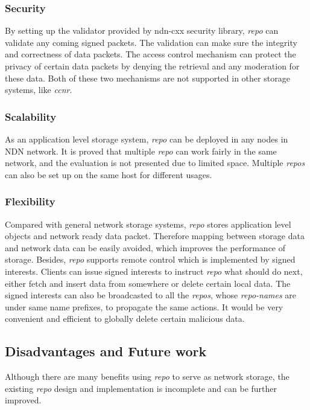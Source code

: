 \documentclass[conference]{IEEEtran}
\begin{document}
\subsubsection{Security}

By setting up the validator provided by ndn-cxx security library, \emph{repo} can validate any coming signed packets. The validation can make sure the integrity and correctness of data packets. The access control mechanism can protect the privacy of certain data packets by denying the retrieval and any moderation for these data. Both of these two mechanisms are not supported in other storage systems, like \emph{ccnr}.

\subsubsection{Scalability}

As an application level storage system, \emph{repo} can be deployed in any nodes in NDN network. It is proved that multiple \emph{repo} can work fairly in the same network, and the evaluation is not presented due to limited space. Multiple \emph{repos} can also be set up on the same host for different usages.

\subsubsection{Flexibility}

Compared with general network storage systems, \emph{repo} stores application level objects and network ready data packet. Therefore mapping between storage data and network data can be easily avoided, which improves the performance of storage. Besides, \emph{repo} supports remote control which is implemented by signed interests. Clients can issue signed interests to instruct \emph{repo} what should do next, either fetch and insert data from somewhere or delete certain local data. The signed interests can also be broadcasted to all the \emph{repos}, whose \emph{repo-names} are under same name prefixes, to propagate the same actions. It would be very convenient and efficient to globally delete certain malicious data.

\subsection{Disadvantages and Future work}

Although there are many benefits using \emph{repo} to serve as network storage, the existing \emph{repo} design and implementation is incomplete and can be further improved.
\end{document}
